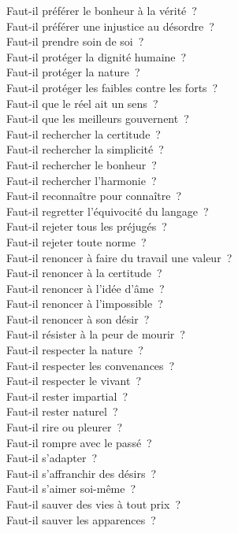 \documentclass[a4paper,12pt]{article}
\begin{document}
Faut-il préférer le bonheur à la vérité ? \\
Faut-il préférer une injustice au désordre ? \\
Faut-il prendre soin de soi ? \\
Faut-il protéger la dignité humaine ? \\
Faut-il protéger la nature ? \\
Faut-il protéger les faibles contre les forts ? \\
Faut-il que le réel ait un sens ? \\
Faut-il que les meilleurs gouvernent ? \\
Faut-il rechercher la certitude ? \\
Faut-il rechercher la simplicité ? \\
Faut-il rechercher le bonheur ? \\
Faut-il rechercher l'harmonie ? \\
Faut-il reconnaître pour connaître ? \\
Faut-il regretter l'équivocité du langage ? \\
Faut-il rejeter tous les préjugés ? \\
Faut-il rejeter toute norme ? \\
Faut-il renoncer à faire du travail une valeur ? \\
Faut-il renoncer à la certitude ? \\
Faut-il renoncer à l'idée d'âme ? \\
Faut-il renoncer à l'impossible ? \\
Faut-il renoncer à son désir ? \\
Faut-il résister à la peur de mourir ? \\
Faut-il respecter la nature ? \\
Faut-il respecter les convenances ? \\
Faut-il respecter le vivant ? \\
Faut-il rester impartial ? \\
Faut-il rester naturel ? \\
Faut-il rire ou pleurer ? \\
Faut-il rompre avec le passé ? \\
Faut-il s'adapter ? \\
Faut-il s'affranchir des désirs ? \\
Faut-il s'aimer soi-même ? \\
Faut-il sauver des vies à tout prix ? \\
Faut-il sauver les apparences ? \\
\end{document}
